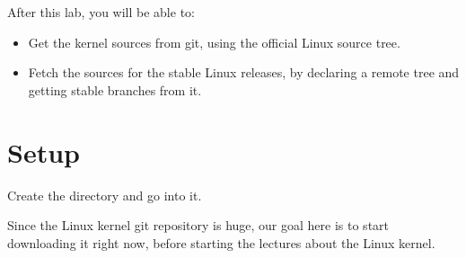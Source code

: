 
After this lab, you will be able to:
\begin{itemize}
\item Get the kernel sources from git, using the official Linux source
      tree.
\item Fetch the sources for the stable Linux releases, by declaring
      a remote tree and getting stable branches from it.
\end{itemize}

\section{Setup}

Create the  directory and go into it.

Since the Linux kernel git repository is huge, our goal here is to start
downloading it right now, before starting the lectures about the Linux
kernel.


